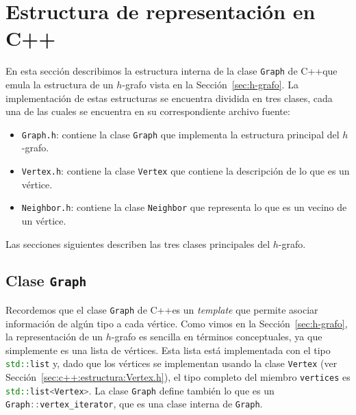 \documentclass[%
    a4paper,%
    fontsize=12pt,%
    DIV=12,
    twoside,%
    openright,%
    titlepage=true,%
    headsepline,%
    toc=bibliography,%
    parskip=half,%
    cleardoublepage=empty,%
    headings=big,%
]{scrbook}
\makeatletter
\newcommand{\Code}[2][]{\lstinline[basicstyle={\ttfamily},#1]@#2@}
\newcommand{\CPPCode}[2][]{\lstinline[language=C++,basicstyle={\ttfamily},#1]@#2@}
\newcommand{\Graph}{\CPPCode{Graph}\xspace}
\DeclareRobustCommand{\CPP}{C\nolinebreak[4]\hspace{-.05em}\raisebox{.4ex}{\relsize{-3}\textbf{++}}\xspace}
\def\CPP{C++}%
\makeatother
\begin{document}
% 
% 
% 
% 
% 
% 





\section{Estructura de representación en \CPP}
\label{sec:c++:estructura}

En esta sección describimos la estructura interna de la clase \Graph de \CPP que emula la estructura de un $h$-grafo vista en la Sección~\ref{sec:h-grafo}.  La implementación de estas estructuras se encuentra dividida en tres clases, cada una de las cuales se encuentra en su correspondiente archivo fuente:
\begin{itemize}
  \item \Code{Graph.h}: contiene la clase \CPPCode{Graph} que implementa la estructura principal del $h$-grafo.
  \item \Code{Vertex.h}: contiene la clase \CPPCode{Vertex} que contiene la descripción de lo que es un vértice.
  \item \Code{Neighbor.h}: contiene la clase \CPPCode{Neighbor} que representa lo que es un vecino de un vértice.
\end{itemize}
Las secciones siguientes describen las tres clases principales del $h$-grafo.

\subsection{Clase \texorpdfstring{\protect\CPPCode{Graph}}{Graph}}
\label{sec:c++:estructura:Graph.h}

Recordemos que el clase \Graph de \CPP es un \emph{template} que permite asociar información de algún tipo a cada vértice.  Como vimos en la Sección~\ref{sec:h-grafo}, la representación de un $h$-grafo es sencilla en términos conceptuales, ya que simplemente es una lista de vértices.  Esta lista está implementada con el tipo \CPPCode{std::list} y, dado que los vértices se implementan usando la clase \CPPCode{Vertex} (ver Sección~\ref{sec:c++:estructura:Vertex.h}), el tipo completo del miembro \CPPCode{vertices} es \CPPCode{std::list<Vertex>}.  La clase \Graph define también lo que es un \CPPCode{Graph::vertex_iterator}, que es una clase interna de \Graph.  
\end{document}
